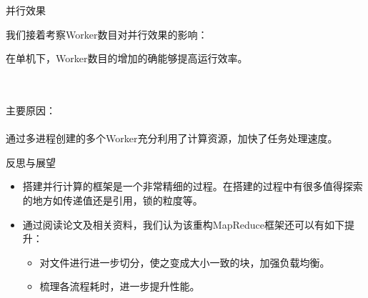\begin{frame}{\begin{CJK}{UTF8}{gkai}并行效果\end{CJK}}
	\begin{CJK}{UTF8}{gkai}
		我们接着考察Worker数目对并行效果的影响：
	\end{CJK}
	\begin{table}[ht]
		\centering
		
	\end{table}
	\begin{CJK}{UTF8}{gkai}
		\centerline{在单机下，Worker数目的增加的确能够提高运行效率。}\\
		\
		\newline\\
		主要原因：\\
		\\
		通过多进程创建的多个Worker充分利用了计算资源，加快了任务处理速度。
	\end{CJK}
\end{frame}

\begin{frame}{\begin{CJK}{UTF8}{gkai}
			反思与展望
	\end{CJK}}
\begin{itemize}
	\item 
	\begin{CJK}{UTF8}{gkai}
	搭建并行计算的框架是一个非常精细的过程。在搭建的过程中有很多值得探索的地方如传递值还是引用，锁的粒度等。
		\end{CJK}
	\item \begin{CJK}{UTF8}{gkai}
	通过阅读论文及相关资料，我们认为该重构MapReduce框架还可以有如下提升：
	\end{CJK}
	\begin{itemize}
		\item 
		\begin{CJK}{UTF8}{gkai}
			对文件进行进一步切分，使之变成大小一致的块，加强负载均衡。
				\end{CJK}
			\item \begin{CJK}{UTF8}{gkai}
				梳理各流程耗时，进一步提升性能。
				
			\end{CJK}
		\end{itemize}
	

\end{itemize}

\end{frame}

